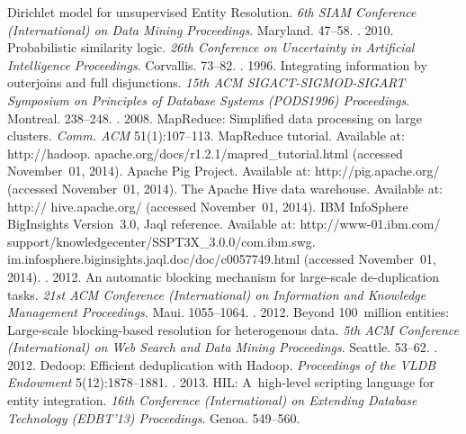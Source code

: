 \begin{multicols}{2}
{{\begin{thebibliography}{99}
Dirichlet model for unsupervised Entity Resolution.
\textit{6th SIAM  Conference (International) on Data Mining Proceedings}. Maryland. 47--58.
. 2010.
Probabilistic similarity logic. \textit{26th Conference on Uncertainty in Artificial Intelligence
Proceedings}. Corvallis. 73--82.
. 1996. Integrating information by
outerjoins and full disjunctions. \textit{15th ACM SIGACT-SIGMOD-SIGART Symposium
on Principles of Database Systems (PODS1996) Proceedings}. Montreal. 238--248.
. 2008. MapReduce: Simplified
data processing on large clusters.
\textit{Comm. ACM} 51(1):107--113.
MapReduce tutorial. Available at:
{\sf http://hadoop. apache.org/docs/r1.2.1/mapred\_tutorial.html} (accessed November~01, 2014).
Apache Pig Project. Available at: {\sf http://pig.apache.org/} (accessed November~01, 2014).
The Apache Hive data warehouse. Available at:
{\sf http:// hive.apache.org/} (accessed November~01, 2014).
IBM InfoSphere BigInsights Version~3.0, Jaql reference.
Available at: {\sf http://www-01.ibm.com/\linebreak
support/knowledgecenter/SSPT3X\_3.0.0/com.ibm.swg. im.infosphere.biginsights.jaql.doc/doc/c0057749.html} (accessed November~01, 2014).
.
2012. An automatic blocking mechanism for large-scale de-duplication tasks.
\textit{21st ACM  Conference (International) on Information and Knowledge Management
Proceedings}. Maui. 1055--1064.
. 2012. Beyond 100~million entities: Large-scale blocking-based
resolution for heterogenous data. \textit{5th ACM  Conference (International) on
Web Search and Data Mining Proceedings}. Seattle. 53--62.
. 2012. Dedoop: Efficient deduplication with
Hadoop. \textit{Proceedings of the VLDB Endowment} 5(12):1878--1881.
. 2013. HIL: A~high-level scripting language for entity integration.
\textit{16th  Conference (International) on Extending Database Technology (EDBT'13)
Proceedings}.  Genoa. 549--560.
\end{thebibliography}

 }
 }

\end{multicols}

